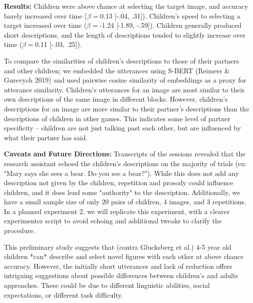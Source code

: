 \documentclass[11pt,a4paper]{article}
\begin{document}
\textbf{Results:} 
Children were above chance at selecting the target image, and accuracy barely increased over time ($\beta=$0.13 [-.04, .31]). Children's speed to selecting a target increased over time ($\beta=$-1.24 [-1.89, -.59]). Children generally produced short descriptions, and the length of descriptions tended to slightly increase over time ($\beta=$0.11 [-.03, .25]). 

To compare the similarities of children's descriptions to those of their partners and other children; we embedded the utterances using S-BERT (Reimers \& Gurevych 2019) and used pairwise cosine similarity of embeddings as a proxy for utterance similarity. Children's utterances for an image are most similar to their own descriptions of the same image in different blocks. However, children's descriptions for an image are more similar to their partner's descriptions than the descriptions of children in other games. This indicates some level of partner specificity -- children are not just talking past each other, but are influenced by what their partner has said. 

\textbf{Caveats and Future Directions:} 
Transcripts of the sessions revealed that the research assistant echoed the children's descriptions on the majority of trials (ex: "Mary says she sees a bear. Do you see a bear?"). While this does not add any description not given by the children, repetition and prosody could influence children, and it does lend some "authority" to the description. Additionally, we have a small sample size of only 20 pairs of children, 4 images, and 3 repetitions. In a planned experiment 2, we will replicate this experiment, with a clearer experimenter script to avoid echoing and additional tweaks to clarify the procedure. 

This preliminary study suggests that (contra Glucksberg et al.) 4-5 year old children *can* describe and select novel figures with each other at above chance accuracy. However, the initially short utterances and lack of reduction offers intriguing suggestions about possible differences between children's and adults approaches. These could be due to different linguistic abilities, social expectations, or different task difficulty. 
\newpage
\end{document}
